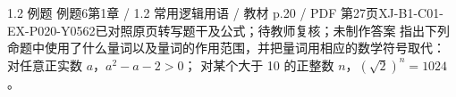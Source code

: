 \par\noindent\begin{minipage}{\linewidth}
\begin{bankitem}{1.2 例题 例题6}{第1章 / 1.2 常用逻辑用语 / 教材 p.20 / PDF 第27页}{XJ-B1-C01-EX-P020-Y0562}{已对照原页转写题干及公式；待教师复核；未制作答案}
指出下列命题中使用了什么量词以及量词的作用范围，并把量词用相应的数学符号取代：
对任意正实数 $a$，$a^2-a-2>0$；
对某个大于 10 的正整数 $n$，$(\sqrt2)^n=1024$。
\end{bankitem}
\end{minipage}\par\medskip
